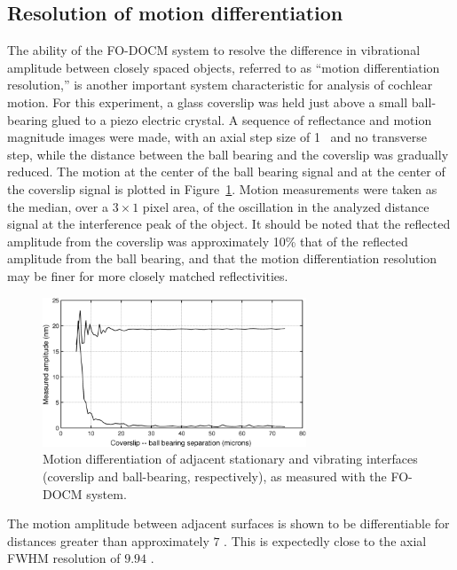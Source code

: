 \subsection{Resolution of motion differentiation}

The ability of the FO-DOCM system to resolve the difference in vibrational amplitude between closely spaced objects, referred to as ``motion differentiation resolution,'' is another important system characteristic for analysis of cochlear motion. For this experiment, a glass coverslip was held just above a small ball-bearing glued to a piezo electric crystal. A sequence of reflectance and motion magnitude images were made, with an axial step size of 1 \micron~and no transverse step, while the distance between the ball bearing and the coverslip was gradually reduced. The motion at the center of the ball bearing signal and at the center of the coverslip signal is plotted in Figure~\ref{fig:diff}. Motion measurements were taken as the median, over a $3 \times 1$ pixel area, of the oscillation in the analyzed distance signal at the interference peak of the object. It should be noted that the reflected amplitude from the coverslip was approximately 10\% that of the reflected amplitude from the ball bearing, and that the motion differentiation resolution may be finer for more closely matched reflectivities.

\begin{figure}[h!]
\centering
\includegraphics[width=0.7\textwidth]{Images/Results/mdif2.png}
\caption[Motion differentiation of adjacent stationary and vibrating interfaces.]{Motion differentiation of adjacent stationary and vibrating interfaces (coverslip and ball-bearing, respectively), as measured with the FO-DOCM system.\label{fig:diff}}
\end{figure}

The motion amplitude between adjacent surfaces is shown to be differentiable for distances greater than approximately $7$ \micron. This is expectedly close to the axial FWHM resolution of $9.94$ \micron.

